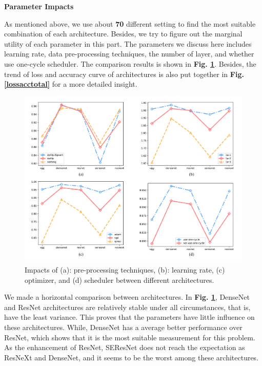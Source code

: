 \documentclass[a4paper]{article}
\begin{document}
\vspace{2mm}
\begin{center}
\large\textbf{Parameter Impacts} \\
\end{center}

\large{
As mentioned above, we use about \textbf{70} different setting to find the most suitable combination of each architecture. Besides, we try to figure out the marginal utility of each parameter in this part. The parameters we discuss here includes learning rate, data pre-processing techniques, the number of layer, and whether use one-cycle scheduler. The comparison results is shown in \textbf{Fig. \ref{impacttotal}}. Besides, the trend of loss and accuracy curve of architectures is also put together in \textbf{Fig. \ref{lossacctotal}} for a more detailed insight.

\begin{figure}[h]
\centering
\includegraphics[width=15cm]{impact_total.pdf}
\caption{ Impacts of (a): pre-processing techniques, (b): learning rate, (c) optimizer, and (d) scheduler between different architectures.}
\label{impacttotal}
\end{figure}

We made a horizontal comparison between architectures. In \textbf{Fig. \ref{impacttotal}}, \textsf{DenseNet} and \textsf{ResNet} architectures are relatively stable under all circumstances, that is, have the least variance. This proves that the parameters have little influence on these architectures. While, \textsf{DenseNet} has a average better performance over \textsf{ResNet}, which shows that it is the most suitable measurement for this problem. As the enhancement of \textsf{ResNet}, \textsf{SEResNet} does not reach the expectation as \textsf{ResNeXt} and \textsf{DenseNet}, and it seems to be the worst among these architectures. 

}
\end{document}

